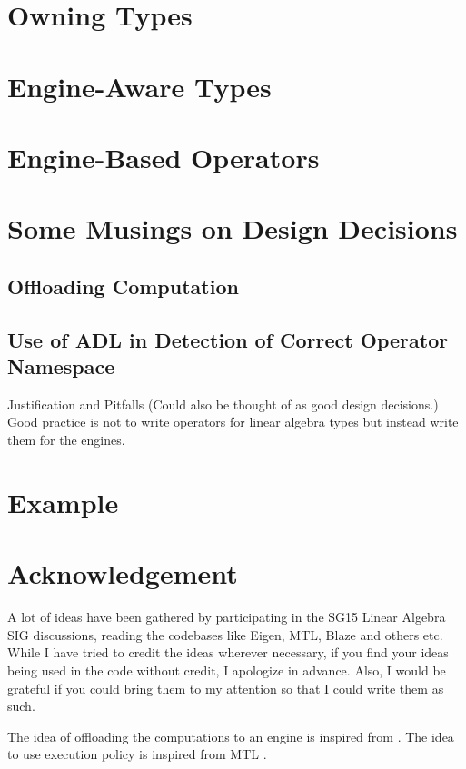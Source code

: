 \documentclass[oneside,11pt,a4paper]{jbarticle}
\begin{document}
\section{Owning Types}
\section{Engine-Aware Types}
\section{Engine-Based Operators}
\section{Some Musings on Design Decisions}
\subsection{Offloading Computation}
\subsection{Use of ADL in Detection of Correct Operator Namespace}
Justification and Pitfalls (Could also be thought of as good design decisions.)
Good practice is not to write operators for linear algebra types but instead
write them for the engines.
\section{Example}
\section{Acknowledgement}
A lot of ideas have been gathered by participating in the SG15 Linear Algebra
SIG discussions, reading the codebases like Eigen, MTL, Blaze and others etc.
While I have tried to credit the ideas wherever necessary, if you find your
ideas being used in the code without credit, I apologize in advance. Also, I
would be grateful if you could bring them to my attention so that I could write
them as such.

The idea of offloading the computations to an engine is inspired from
\cite{GuyDavidson2018}. The idea to use execution policy is inspired from MTL
.


\printbibliography
\end{document}
